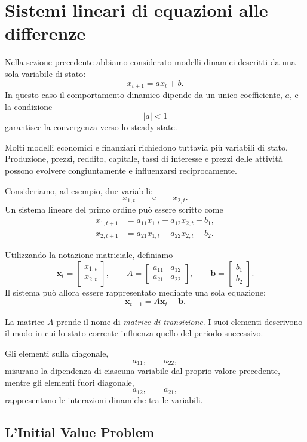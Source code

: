 \documentclass{book}
\begin{document}
\section{Sistemi lineari di equazioni alle differenze}

Nella sezione precedente abbiamo considerato modelli dinamici descritti da
una sola variabile di stato:
\[
x_{t+1}=ax_t+b.
\]
In questo caso il comportamento dinamico dipende da un unico coefficiente,
$a$, e la condizione
\[
|a|<1
\]
garantisce la convergenza verso lo steady state.

Molti modelli economici e finanziari richiedono tuttavia più variabili di
stato. Produzione, prezzi, reddito, capitale, tassi di interesse e prezzi
delle attività possono evolvere congiuntamente e influenzarsi
reciprocamente.

Consideriamo, ad esempio, due variabili:
\[
x_{1,t}
\qquad\text{e}\qquad
x_{2,t}.
\]
Un sistema lineare del primo ordine può essere scritto come
\[
\begin{aligned}
x_{1,t+1}
&=
a_{11}x_{1,t}+a_{12}x_{2,t}+b_1,\\
x_{2,t+1}
&=
a_{21}x_{1,t}+a_{22}x_{2,t}+b_2.
\end{aligned}
\]

Utilizzando la notazione matriciale, definiamo
\[
\mathbf{x}_t=
\begin{bmatrix}
x_{1,t}\\
x_{2,t}
\end{bmatrix},
\qquad
A=
\begin{bmatrix}
a_{11}&a_{12}\\
a_{21}&a_{22}
\end{bmatrix},
\qquad
\mathbf{b}=
\begin{bmatrix}
b_1\\
b_2
\end{bmatrix}.
\]
Il sistema può allora essere rappresentato mediante una sola equazione:
\[
\mathbf{x}_{t+1}
=
A\mathbf{x}_t+\mathbf{b}.
\]

La matrice $A$ prende il nome di \emph{matrice di transizione}. I suoi
elementi descrivono il modo in cui lo stato corrente influenza quello del
periodo successivo.

Gli elementi sulla diagonale,
\[
a_{11},\qquad a_{22},
\]
misurano la dipendenza di ciascuna variabile dal proprio valore precedente,
mentre gli elementi fuori diagonale,
\[
a_{12},\qquad a_{21},
\]
rappresentano le interazioni dinamiche tra le variabili.


\subsection{L'Initial Value Problem}
\end{document}
